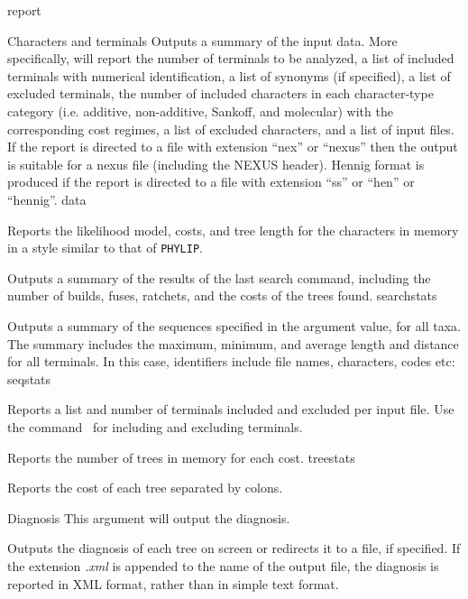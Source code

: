 \begin{command}{report}{}
\begin{arguments}
\begin{argumentgroup}{Characters and terminals}
{Outputs a summary of the input data.
More specifically, \poy will report the number of
terminals to be analyzed, a list of included terminals with
numerical identification, a list
of synonyms (if specified), a list of excluded terminals, the
number of included characters in each character-type category
(i.e. additive, non-additive, Sankoff, and molecular) with the corresponding
cost regimes, a list of excluded
characters, and a list of input files. If the report is directed
to a file with extension ``nex'' or ``nexus'' then
the output is suitable for a nexus file (including the NEXUS
header). Hennig format is produced if the report is directed
to a file with extension ``ss'' or ``hen'' or ``hennig''.}
{data}

{Reports the likelihood model, costs, and tree length for the
characters in memory in a style similar to that of \texttt{PHYLIP}.}
{}

{Outputs a summary of the results of the last search command,
including the number of builds, fuses, ratchets, and the costs of
the trees found.}
{searchstats}

{Outputs a summary of the sequences specified in the argument
value, for all taxa. The summary includes the maximum, minimum,
and average length and distance for all terminals. In this case, identifiers
include file names, characters, codes etc:}
{seqstats}

{Reports a list and number of terminals included and excluded
per input file. Use the command~ for including and excluding
terminals.}
{}

{Reports the number of trees in memory for each cost.}
{treestats}

{Reports the cost of each tree separated by colons.}
{}

\end{argumentgroup}

\begin{argumentgroup}{Diagnosis}
{This argument will output the diagnosis.} 

{Outputs the diagnosis of each tree on screen or redirects it to a file, if
specified. If the extension \emph{.xml} is appended to the name of the
output file, the diagnosis is reported in XML format, rather than in
simple text format. }%
{}


\end{argumentgroup}
\end{arguments}
\end{command}
